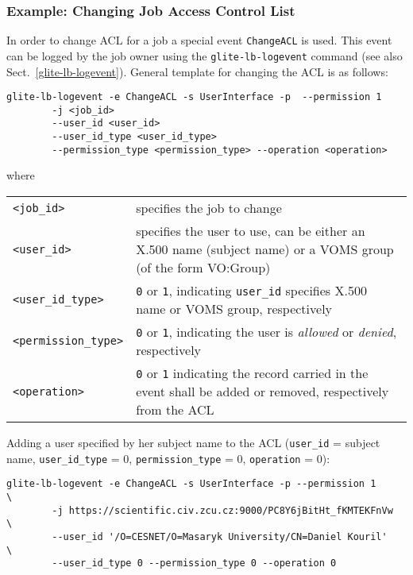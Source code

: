 \subsubsection{Example: Changing Job Access Control List}
\label{e:change-acl}

In order to change ACL for a job a special event \verb'ChangeACL' is used. This
event can be logged by the job owner using the \verb'glite-lb-logevent' command
(see also Sect.~\ref{glite-lb-logevent}). General template for changing the ACL
is as follows:

\begin{verbatim}
glite-lb-logevent -e ChangeACL -s UserInterface -p	--permission 1          
        -j <job_id>                                                     
        --user_id <user_id>                                             
        --user_id_type <user_id_type>                                   
        --permission_type <permission_type> --operation <operation>
\end{verbatim}

where

\begin{tabularx}{\textwidth}{lX}
\verb'<job_id>'    & specifies the job to change \\
\verb'<user_id>'   & specifies the user to use, can be either an X.500 name
                     (subject name) or a VOMS group (of the form 
                      VO:Group)\\
\verb'<user_id_type>'    & \verb'0' or \verb'1', indicating \verb'user_id'
                     specifies X.500 name or VOMS group, respectively \\
\verb'<permission_type>' & \verb'0' or \verb'1', indicating the user is 
                     \textit{allowed} or \textit{denied}, respectively \\
\verb'<operation>' & \verb'0' or \verb'1' indicating the record carried in
                     the event shall be added or removed, respectively from
		     the ACL \\
\end{tabularx}

Adding a user specified by her subject name to the ACL (\verb'user_id' =
subject name, \verb'user_id_type' = 0, \verb'permission_type' = 0,
\verb'operation' = 0):

\begin{verbatim}
glite-lb-logevent -e ChangeACL -s UserInterface -p --permission 1       \
        -j https://scientific.civ.zcu.cz:9000/PC8Y6jBitHt_fKMTEKFnVw    \
        --user_id '/O=CESNET/O=Masaryk University/CN=Daniel Kouril'     \
        --user_id_type 0 --permission_type 0 --operation 0
\end{verbatim}

